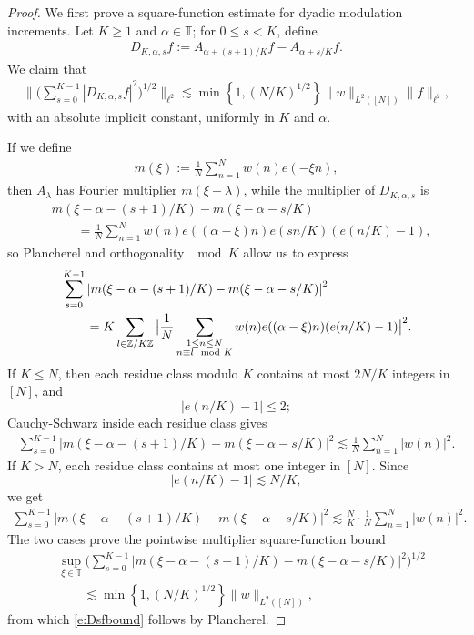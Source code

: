\documentclass[12pt]{amsart}
\numberwithin{equation}{section}
\theoremstyle{definition}
\begin{document}
\begin{proof}
We first prove a square-function estimate for dyadic modulation increments.  Let
\(K\geq1\) and \(\alpha\in\mathbb T\); for \(0\leq s<K\), define
\begin{align}
    D_{K,\alpha,s}f
    :=
    A_{\alpha+(s+1)/K}f-A_{\alpha+s/K}f.
\end{align}
We claim that
\begin{align}\label{e:Dsfbound}
    \Big\|
    \big(\sum_{s=0}^{K-1}|D_{K,\alpha,s}f|^2\big)^{1/2}
    \Big\|_{\ell^2}
    \lesssim
    \min\left\{1,(N/K)^{1/2}\right\}
    \|w\|_{L^2([N])}\|f\|_{\ell^2},
\end{align}
with an absolute implicit constant, uniformly in \(K\) and \(\alpha\).

If we define
\begin{align}
    m(\xi):=\frac1N\sum_{n=1}^N w(n)e(-\xi n),
\end{align}
then \(A_\lambda\) has Fourier multiplier \(m(\xi-\lambda)\), while the multiplier of
\(D_{K,\alpha,s}\) is
\begin{align}
    &m(\xi-\alpha-(s+1)/K)-m(\xi-\alpha-s/K) \\
    & \qquad = \frac1N\sum_{n=1}^N
    w(n)e((\alpha-\xi)n)e(sn/K)(e(n/K)-1),
\end{align}
so Plancherel and orthogonality \(\mod K\) allow us to express
\begin{align}
    &\sum_{s=0}^{K-1}
    \left|
    m(\xi-\alpha-(s+1)/K)-m(\xi-\alpha-s/K)
    \right|^2\notag\\
    &\qquad=
    K\sum_{l \in\mathbb Z/K\mathbb Z}
    \big|
    \frac{1}{N} \sum_{\substack{1\leq n\leq N\\ n\equiv l \mod K}}
    w(n) e((\alpha-\xi)n)(e(n/K)-1)
    \big|^2.
\end{align}
If \(K\leq N\), then each residue class modulo \(K\) contains at most \(2N/K\)
integers in \([N]\), and 
\[ |e(n/K)-1|\leq2;\]  Cauchy-Schwarz inside each residue class gives
\begin{align}
    \sum_{s=0}^{K-1}
    \left|
    m(\xi-\alpha-(s+1)/K)-m(\xi-\alpha-s/K)
    \right|^2
    \lesssim
    \frac1N\sum_{n=1}^N|w(n)|^2.
\end{align}
If \(K>N\), each residue class contains at most one integer in \([N]\).  Since
\[ |e(n/K)-1|\lesssim  N/K,\]
we get
\begin{align}
    \sum_{s=0}^{K-1}
    \left|
    m(\xi-\alpha-(s+1)/K)-m(\xi-\alpha-s/K)
    \right|^2
    \lesssim
    \frac NK\cdot \frac1N\sum_{n=1}^N|w(n)|^2.
\end{align}
The two cases prove the pointwise multiplier square-function bound
\begin{align}\label{e:multsf}
    &\sup_{\xi\in\mathbb T}
    \big(
    \sum_{s=0}^{K-1}
    \left|
    m(\xi-\alpha-(s+1)/K)-m(\xi-\alpha-s/K)
    \right|^2
    \big)^{1/2} \\
& \qquad     \lesssim
    \min\left\{1,(N/K)^{1/2}\right\}
    \|w\|_{L^2([N])},
\end{align}
from which \eqref{e:Dsfbound} follows by Plancherel.


\end{proof}
\end{document}
